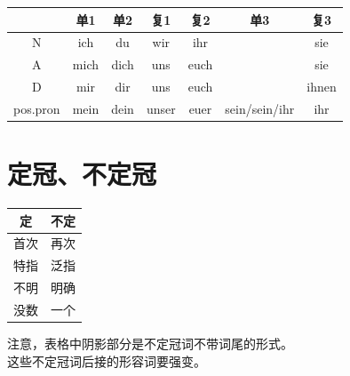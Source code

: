 \begin{center}
    \begin{tabular}{|c|c|c|c|c|c|c|}
        \hline
                 & 单1   & 单2   & 复1    & 复2   & 单3            & 复3    \\
        \hline
        N        & ich  & du   & wir   & ihr  &               & sie   \\
        \hline
        A        & mich & dich & uns   & euch &               & sie   \\
        \hline
        D        & mir  & dir  & uns   & euch &               & ihnen \\
        \hline
        pos.pron & mein & dein & unser & euer & sein/sein/ihr & ihr   \\
        \hline
    \end{tabular}
\end{center}

\section{定冠、不定冠}
\begin{center}
    \begin{tabular}{|c|c|}
        \hline
        定  & 不定 \\
        \hline
        首次 & 再次 \\
        \hline
        特指 & 泛指 \\
        \hline
        不明 & 明确 \\
        \hline
        没数 & 一个 \\
        \hline
    \end{tabular}
\end{center}

注意，表格中阴影部分是不定冠词不带词尾的形式。\\
这些不定冠词后接的形容词要强变。

